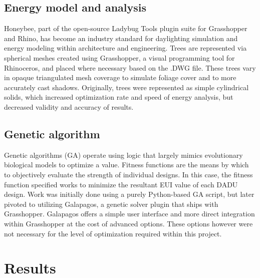 \documentclass[sagev,doublespace,times,Review]{sagej}
\begin{document}
\subsection{Energy model and analysis}
Honeybee, part of the open-source Ladybug Tools plugin suite for Grasshopper and Rhino, has become an industry standard for daylighting simulation and energy modeling within architecture and engineering. 
Trees are represented via spherical meshes created using Grasshopper, a visual programming tool for Rhinoceros, and placed where necessary based on the .DWG file. These trees vary in opaque triangulated mesh coverage to simulate foliage cover and to more accurately cast shadows. Originally, trees were represented as simple cylindrical solids, which increased optimization rate and speed of energy analysis, but decreased validity and accuracy of results.

\subsection{Genetic algorithm}
Genetic algorithms (GA) operate using logic that largely mimics evolutionary biological models to optimize a value. Fitness functions are the means by which to objectively evaluate the strength of individual designs. In this case, the fitness function specified works to minimize the resultant EUI value of each DADU design. Work was initially done using a purely Python-based GA script, but later pivoted to utilizing Galapagos, a genetic solver plugin that ships with Grasshopper. Galapagos offers a simple user interface and more direct integration within Grasshopper at the cost of advanced options. These options however were not necessary for the level of optimization required within this project.

\section{Results}
\end{document}
